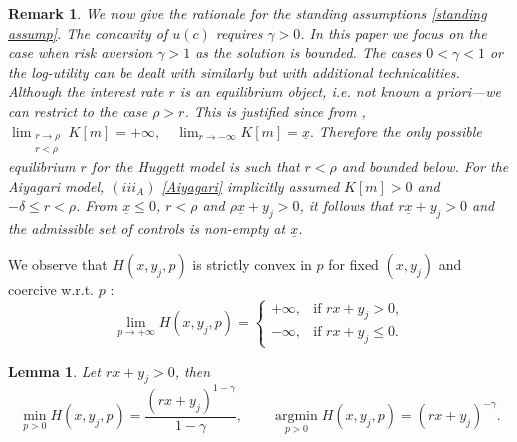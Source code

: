 \documentclass[11pt]{article}
\numberwithin{equation}{section}
\newtheorem{lemma}[theorem]{Lemma}
\newtheorem{remark}[theorem]{Remark}
\theoremstyle{Claim}
\newcommand{\ux}{{\underline x}}
\theoremstyle{plain}
\begin{document}
\begin{remark}
We now give the rationale for the standing assumptions \eqref{standing assump}. The concavity of $u(c)$ requires $\gamma>0$. In this paper we focus on the case when risk aversion $\gamma>1$ as the solution is bounded. The cases $0<\gamma<1$ or the log-utility can be dealt with similarly but with additional technicalities. Although the interest rate $r$ is an equilibrium object, i.e.  not known a priori—we can restrict to the case $\rho > r$. This  is justified since from \cite[Proposition 4, p. 66]{achdou2022income},
$
\lim_{\substack{r\to \rho\\ r<\rho}}  K[m] =+\infty,\quad \lim_{r\to -\infty} K[m] =\ux.
$
Therefore the only possible equilibrium $r$ for the Huggett model is such that $r<\rho$ and bounded below. For the Aiyagari model, $(iii_A)$ \eqref{Aiyagari} implicitly assumed $K[m]> 0$ and $-\delta\leq r<\rho$. From $\ux\leq 0$, $r<\rho$ and $\rho \ux + y_j > 0$, it follows that $r\ux + y_j > 0$ and the admissible set of controls is non-empty at $\ux$.
\end{remark}
We observe that $H(x, y_j , p)$ is strictly convex in $p$ for fixed $(x, y_j)$ and coercive w.r.t. $p$ :
\begin{equation}\label{coerc}
	\lim_{p\to +\infty}H(x, y_j, p) =
\begin{cases}
	+\infty, & \text{if } rx+y_j> 0, \\
	-\infty, & \text{if } rx+y_j\leq  0.
\end{cases}	
\end{equation}
\begin{lemma}\label{lemma:H}
Let $rx+y_j>0$, then
\begin{equation}\label{H min}
	\min_{p > 0} H(x, y_j , p) = \frac{(rx + y_j )^{1 - \gamma}}{1 - \gamma}, \qquad \mathop{\arg\min}\limits_{p > 0} H(x, y_j , p) = (rx + y_j )^{-\gamma}.
\end{equation}
\end{lemma}
\end{document}
